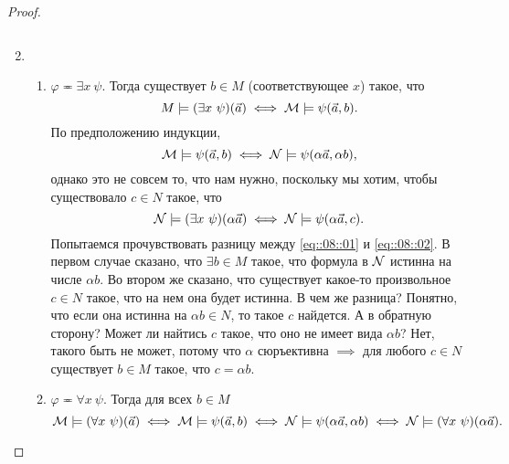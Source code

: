 \begin{proof}
\begin{enumerate}
\begin{enumerate}
$$        $$
        \end{enumerate}
        \item \begin{enumerate}
            \item $\varphi \eqcirc \exists x~ \psi$.
        Тогда существует $b \in M$ (соответствующее $x$) такое, что
        $$
            M \models (\exists x~\psi)(\vec{a}) \iff \mathcal{M} \models \psi(\vec{a}, b).
        $$
        По предположению индукции,
        \begin{equation} \label{eq::08::01}
            \mathcal{M} \models \psi(\vec{a}, b) \iff \mathcal{N} \models \psi (\alpha \vec{a}, \alpha b),
        \end{equation}
        однако это не совсем то, что нам нужно, поскольку мы хотим, чтобы существовало $c \in N$ такое, что
        \begin{equation} \label{eq::08::02}
            \mathcal{N} \models (\exists x~\psi)(\alpha \vec{a}) \iff \mathcal{N} \models \psi(\alpha \vec{a}, c).
        \end{equation}
        Попытаемся прочувствовать разницу между \eqref{eq::08::01} и \eqref{eq::08::02}.
        В первом случае сказано, что $\exists b \in M$ такое, что формула в $\mathcal{N}$ истинна на числе $\alpha b$.
        Во втором же сказано, что существует какое-то произвольное $c \in N$ такое, что на нем она будет истинна.
        В чем же разница?
        Понятно, что если она истинна на $\alpha b \in N$, то такое $c$ найдется.
        А в обратную сторону?
        Может ли найтись $c$ такое, что оно не имеет вида $\alpha b$?
        Нет, такого быть не может, потому что $\alpha$ сюръективна $\implies$ для любого $c \in N$ существует $b \in M$ такое, что $c = \alpha b$.
        \item $\varphi \eqcirc \forall x~\psi$.
        Тогда для всех $b \in M$
        $$
            \mathcal{M} \models (\forall x~\psi)(\vec{a}) \iff \mathcal{M} \models \psi(\vec{a}, b) \iff \mathcal{N} \models \psi(\alpha \vec{a}, \alpha b) \iff \mathcal{N} \models (\forall x~\psi)(\alpha \vec{a}).
        $$ \qedhere
        \end{enumerate}
    \end{enumerate}
\end{proof}

